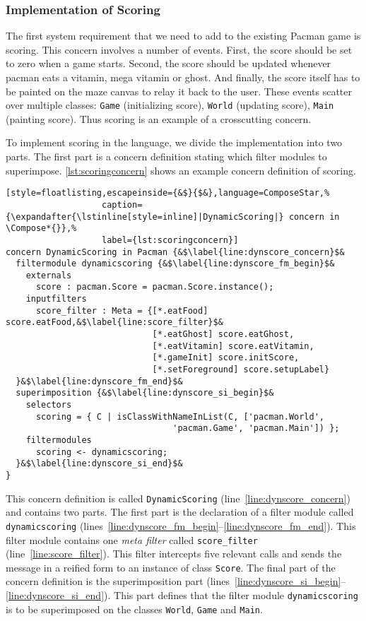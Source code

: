 \subsubsection{Implementation of Scoring}

The first system requirement that we need to add to the existing Pacman game is scoring.
This concern involves a number of events.
First, the score should be set to zero when a game starts.
Second, the score should be updated whenever pacman eats a vitamin, mega vitamin or ghost.
And finally, the score itself has to be painted on the maze canvas to relay it back to the user.
These events scatter over multiple classes: \lstinline|Game| (initializing score), \lstinline|World| (updating score), \lstinline|Main| (painting score).
Thus scoring is an example of a crosscutting concern. 

To implement scoring in the \Compose* language, we divide the implementation into two parts.
The first part is a \Compose* concern definition stating which filter modules to superimpose.
\autoref{lst:scoringconcern} shows an example \Compose* concern definition of scoring.

\begin{lstlisting}[style=floatlisting,escapeinside={&$}{$&},language=ComposeStar,%
                   caption={\expandafter{\lstinline[style=inline]|DynamicScoring|} concern in \Compose*{}},%
                   label={lst:scoringconcern}]
concern DynamicScoring in Pacman {&$\label{line:dynscore_concern}$&
  filtermodule dynamicscoring {&$\label{line:dynscore_fm_begin}$&
    externals
      score : pacman.Score = pacman.Score.instance();
    inputfilters 
      score_filter : Meta = {[*.eatFood] score.eatFood,&$\label{line:score_filter}$&
                             [*.eatGhost] score.eatGhost,
                             [*.eatVitamin] score.eatVitamin,
                             [*.gameInit] score.initScore,
                             [*.setForeground] score.setupLabel}
  }&$\label{line:dynscore_fm_end}$&
  superimposition {&$\label{line:dynscore_si_begin}$&
    selectors
      scoring = { C | isClassWithNameInList(C, ['pacman.World',
                                 'pacman.Game', 'pacman.Main']) };
    filtermodules
      scoring <- dynamicscoring;
  }&$\label{line:dynscore_si_end}$&
}
\end{lstlisting}

This concern definition is called \lstinline|DynamicScoring| (line~\ref{line:dynscore_concern}) and contains two parts.
The first part is the declaration of a filter module called \lstinline|dynamicscoring| (lines~\ref{line:dynscore_fm_begin}--\ref{line:dynscore_fm_end}).
This filter module contains one \emph{meta filter} called \lstinline|score_filter| (line~\ref{line:score_filter}).
This filter intercepts five relevant calls and sends the message in a reified form to an instance of class \lstinline|Score|.
The final part of the concern definition is the superimposition part (lines~\ref{line:dynscore_si_begin}--\ref{line:dynscore_si_end}).
This part defines that the filter module \lstinline|dynamicscoring| is to be superimposed on the classes \lstinline|World|, \lstinline|Game| and \lstinline|Main|.

